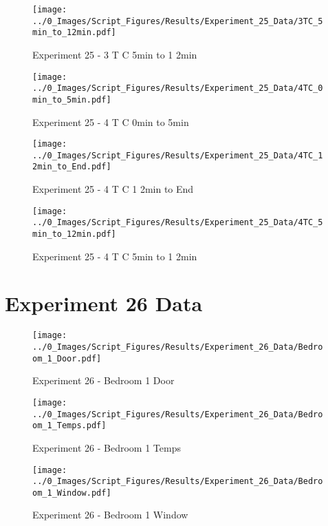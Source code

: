 	\clearpage

	\begin{figure}[H]
		\centering
		\texttt{[image: ../0\_Images/Script\_Figures/Results/Experiment\_25\_Data/3TC\_5min\_to\_12min.pdf]}
		\caption[]{Experiment 25 - 3 T C 5min to 1 2min}
	\end{figure}
 

	\begin{figure}[H]
		\centering
		\texttt{[image: ../0\_Images/Script\_Figures/Results/Experiment\_25\_Data/4TC\_0min\_to\_5min.pdf]}
		\caption[]{Experiment 25 - 4 T C 0min to 5min}
	\end{figure}
 
	\clearpage

	\begin{figure}[H]
		\centering
		\texttt{[image: ../0\_Images/Script\_Figures/Results/Experiment\_25\_Data/4TC\_12min\_to\_End.pdf]}
		\caption[]{Experiment 25 - 4 T C 1 2min to End}
	\end{figure}
 

	\begin{figure}[H]
		\centering
		\texttt{[image: ../0\_Images/Script\_Figures/Results/Experiment\_25\_Data/4TC\_5min\_to\_12min.pdf]}
		\caption[]{Experiment 25 - 4 T C 5min to 1 2min}
	\end{figure}
 
	\clearpage

\clearpage		\large
\section{Experiment 26 Data} \label{App:Exp26Results} 

	\begin{figure}[H]
		\centering
		\texttt{[image: ../0\_Images/Script\_Figures/Results/Experiment\_26\_Data/Bedroom\_1\_Door.pdf]}
		\caption[]{Experiment 26 - Bedroom 1 Door}
	\end{figure}
 

	\begin{figure}[H]
		\centering
		\texttt{[image: ../0\_Images/Script\_Figures/Results/Experiment\_26\_Data/Bedroom\_1\_Temps.pdf]}
		\caption[]{Experiment 26 - Bedroom 1 Temps}
	\end{figure}
 
	\clearpage

	\begin{figure}[H]
		\centering
		\texttt{[image: ../0\_Images/Script\_Figures/Results/Experiment\_26\_Data/Bedroom\_1\_Window.pdf]}
		\caption[]{Experiment 26 - Bedroom 1 Window}
	\end{figure}
 

